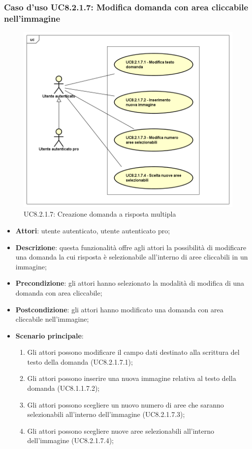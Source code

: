 \subsubsection{Caso d'uso UC8.2.1.7: Modifica domanda con area cliccabile nell'immagine}
\label{UC8.2.1.7}
\begin{figure}[h]
	\centering
	\includegraphics[scale=0.5,keepaspectratio]{UML/UC8_2_1_7.png}
	\caption{UC8.2.1.7: Creazione domanda a risposta multipla}
\end{figure}
\FloatBarrier
\begin{itemize}
	\item \textbf{Attori}: utente autenticato, utente autenticato pro;
	\item \textbf{Descrizione}: questa funzionalità offre agli attori la possibilità di modificare una domanda la cui risposta è selezionabile all'interno di aree cliccabili in un immagine;
	\item \textbf{Precondizione}: gli attori hanno selezionato la modalità di modifica di una domanda con area cliccabile; 
	\item \textbf{Postcondizione}: gli attori hanno modificato una domanda con area cliccabile nell'immagine;
	\item \textbf{Scenario principale}:
		\begin{enumerate}
	       	\item Gli attori possono modificare il campo dati destinato alla scrittura del testo della domanda (UC8.2.1.7.1);
	        \item Gli attori possono inserire una nuova immagine relativa al testo della domanda (UC8.1.1.7.2);
			\item Gli attori possono scegliere un nuovo numero di aree che saranno selezionabili all'interno dell'immagine (UC8.2.1.7.3);
			\item Gli attori possono scegliere nuove aree selezionabili all'interno dell'immagine (UC8.2.1.7.4);
	 	\end{enumerate}
\end{itemize}

